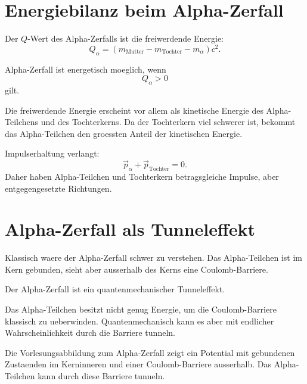 \section{Energiebilanz beim Alpha-Zerfall}

\begin{definitionbox}
Der $Q$-Wert des Alpha-Zerfalls ist die freiwerdende Energie:
\[
    Q_\alpha
    =
    \left(
        m_{\mathrm{Mutter}}
        -
        m_{\mathrm{Tochter}}
        -
        m_{\alpha}
    \right)c^2.
\]
\end{definitionbox}

\begin{conceptbox}
Alpha-Zerfall ist energetisch moeglich, wenn
\[
    Q_\alpha>0
\]
gilt.

Die freiwerdende Energie erscheint vor allem als kinetische Energie des Alpha-Teilchens
und des Tochterkerns.
Da der Tochterkern viel schwerer ist, bekommt das Alpha-Teilchen den groessten Anteil
der kinetischen Energie.
\end{conceptbox}

\begin{formulabox}
Impulserhaltung verlangt:
\[
    \vec p_\alpha + \vec p_{\mathrm{Tochter}} = 0.
\]
Daher haben Alpha-Teilchen und Tochterkern betragsgleiche Impulse, aber entgegengesetzte
Richtungen.
\end{formulabox}

\section{Alpha-Zerfall als Tunneleffekt}

Klassisch waere der Alpha-Zerfall schwer zu verstehen.
Das Alpha-Teilchen ist im Kern gebunden, sieht aber ausserhalb des Kerns eine
Coulomb-Barriere.

\begin{conceptbox}
Der Alpha-Zerfall ist ein quantenmechanischer Tunneleffekt.

Das Alpha-Teilchen besitzt nicht genug Energie, um die Coulomb-Barriere klassisch
zu ueberwinden.
Quantenmechanisch kann es aber mit endlicher Wahrscheinlichkeit durch die Barriere
tunneln.
\end{conceptbox}

\begin{notebox}
Die Vorlesungsabbildung zum Alpha-Zerfall zeigt ein Potential mit gebundenen
Zustaenden im Kerninneren und einer Coulomb-Barriere ausserhalb.
Das Alpha-Teilchen kann durch diese Barriere tunneln.
\end{notebox}

